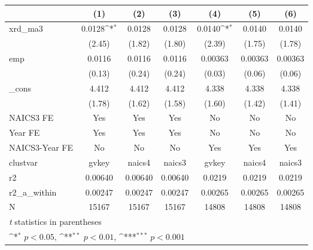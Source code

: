 {
\def\sym#1{\ifmmode^{#1}\else\(^{#1}\)\fi}
\begin{tabular}{l*{6}{c}}
\hline\hline
            &\multicolumn{1}{c}{(1)}         &\multicolumn{1}{c}{(2)}         &\multicolumn{1}{c}{(3)}         &\multicolumn{1}{c}{(4)}         &\multicolumn{1}{c}{(5)}         &\multicolumn{1}{c}{(6)}         \\
\hline
xrd\_ma3     &      0.0128\sym{*}  &      0.0128         &      0.0128         &      0.0140\sym{*}  &      0.0140         &      0.0140         \\
            &      (2.45)         &      (1.82)         &      (1.80)         &      (2.39)         &      (1.75)         &      (1.78)         \\
[1em]
emp         &      0.0116         &      0.0116         &      0.0116         &     0.00363         &     0.00363         &     0.00363         \\
            &      (0.13)         &      (0.24)         &      (0.24)         &      (0.03)         &      (0.06)         &      (0.06)         \\
[1em]
\_cons      &       4.412         &       4.412         &       4.412         &       4.338         &       4.338         &       4.338         \\
            &      (1.78)         &      (1.62)         &      (1.58)         &      (1.60)         &      (1.42)         &      (1.41)         \\
[1em]
NAICS3 FE   &         Yes         &         Yes         &         Yes         &          No         &          No         &          No         \\
[1em]
Year FE     &         Yes         &         Yes         &         Yes         &          No         &          No         &          No         \\
[1em]
NAICS3-Year FE&          No         &          No         &          No         &         Yes         &         Yes         &         Yes         \\
\hline
clustvar    &       gvkey         &      naics4         &      naics3         &       gvkey         &      naics4         &      naics3         \\
r2          &     0.00640         &     0.00640         &     0.00640         &      0.0219         &      0.0219         &      0.0219         \\
r2\_a\_within &     0.00247         &     0.00247         &     0.00247         &     0.00265         &     0.00265         &     0.00265         \\
N           &       15167         &       15167         &       15167         &       14808         &       14808         &       14808         \\
\hline\hline
\multicolumn{7}{l}{\footnotesize \textit{t} statistics in parentheses}\\
\multicolumn{7}{l}{\footnotesize \sym{*} \(p<0.05\), \sym{**} \(p<0.01\), \sym{***} \(p<0.001\)}\\
\end{tabular}
}
